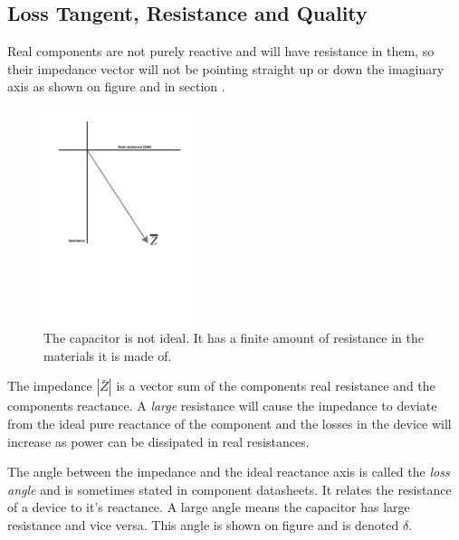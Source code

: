 \subsection{Loss Tangent, Resistance and Quality} \label{subsec:LossTangent}

Real components are not purely reactive and will have resistance in them, so their impedance vector will not be pointing straight up or down the imaginary axis as shown on figure  and in section .

\begin{figure}[H]
    \centering
    \includegraphics[clip, trim=0 250 0 0, width=0.4\textwidth]{Sections/4_TechnicalAnalysis/Figures/4_1_4_LossTangent1.pdf}
    \caption{The capacitor is not ideal. It has a finite amount of resistance in the materials it is made of.}
    \label{fig:4_1_1_LossTangent1}
\end{figure}

The impedance $|\bar Z|$ is a vector sum of the components real resistance and the components reactance. A \textit{large} resistance will cause the impedance to deviate from the ideal pure reactance of the component and the losses in the device will increase as power can be dissipated in real resistances.

The angle between the impedance and the ideal reactance axis is called the \textit{loss angle} and is sometimes stated in component datasheets. It relates the resistance of a device to it's reactance. A large angle means the capacitor has large resistance and vice versa. This angle is shown on figure  and is denoted $\delta$.

